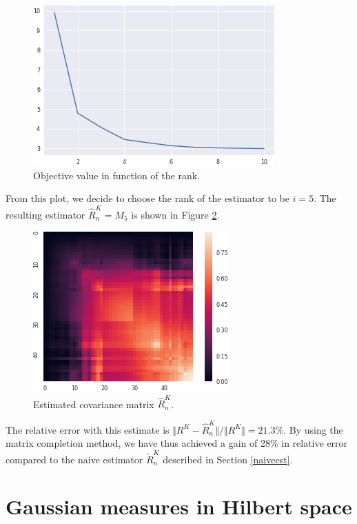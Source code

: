 \documentclass[10pt, a4paper]{report}
\theoremstyle{definition}
\theoremstyle{remark}
\begin{document}
\begin{figure}
\centering
\includegraphics[width=0.7\linewidth]{Code/images/24/obvals}
\caption{Objective value in function of the rank.}
\label{fig:obvals}
\end{figure}
From this plot, we decide to choose the rank of the estimator to be $i=5$. The resulting estimator $\hat{R}_n^K = M_5$  is shown in Figure \ref{fig:estcov}.
\begin{figure}
\centering
\includegraphics[width=0.7\linewidth]{Code/images/24/estcov}
\caption{Estimated covariance matrix $\hat{R}_n^K$.}
\label{fig:estcov}
\end{figure}
The relative error with this estimate is $\Vert R^K - \hat{R}_n^K\Vert / \Vert R^K \Vert = 21.3\%$. By using the matrix completion method, we have thus achieved a gain of 28\% in relative error compared to the naive estimator $\tilde{R}_n^K$ described in Section \ref{naiveest}.


\chapter{Gaussian measures in Hilbert space}\label{chap:gauss}
\end{document}
